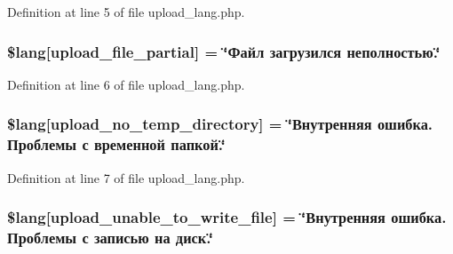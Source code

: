 Definition at line 5 of file upload\+\_\+lang.\+php.

\subsubsection[{\texorpdfstring{\$lang}{$lang}}]{\setlength{\rightskip}{0pt plus 5cm}\$lang\mbox{[}\textquotesingle{}upload\+\_\+file\+\_\+partial\textquotesingle{}\mbox{]} = \char`\"{}Файл загрузился неполностью.\char`\"{}}\hypertarget{application_2language_2russian_2upload__lang_8php_a79751b02ce35007a90bd9052f83deed9}{}\label{application_2language_2russian_2upload__lang_8php_a79751b02ce35007a90bd9052f83deed9}


Definition at line 6 of file upload\+\_\+lang.\+php.

\subsubsection[{\texorpdfstring{\$lang}{$lang}}]{\setlength{\rightskip}{0pt plus 5cm}\$lang\mbox{[}\textquotesingle{}upload\+\_\+no\+\_\+temp\+\_\+directory\textquotesingle{}\mbox{]} = \char`\"{}Внутренняя ошибка. Проблемы с временной папкой.\char`\"{}}\hypertarget{application_2language_2russian_2upload__lang_8php_ac7144f4992346816875bac28488ef715}{}\label{application_2language_2russian_2upload__lang_8php_ac7144f4992346816875bac28488ef715}


Definition at line 7 of file upload\+\_\+lang.\+php.

\subsubsection[{\texorpdfstring{\$lang}{$lang}}]{\setlength{\rightskip}{0pt plus 5cm}\$lang\mbox{[}\textquotesingle{}upload\+\_\+unable\+\_\+to\+\_\+write\+\_\+file\textquotesingle{}\mbox{]} = \char`\"{}Внутренняя ошибка. Проблемы с записью на диск.\char`\"{}}\hypertarget{application_2language_2russian_2upload__lang_8php_a620b622468d4e7781fed6316440c85e7}{}\label{application_2language_2russian_2upload__lang_8php_a620b622468d4e7781fed6316440c85e7}



